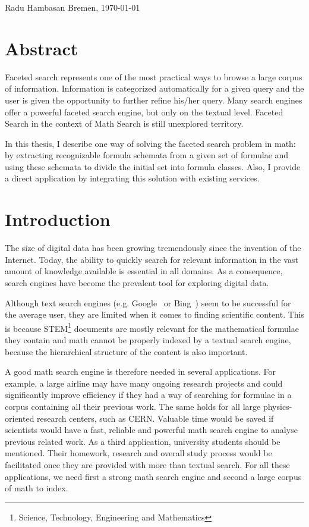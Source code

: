 \documentclass[a4paper,11pt,oneside]{article}
\begin{document}
\vspace{20mm}

Radu Hambasan \hfill Bremen, \today

\newpage

\section*{Abstract}
Faceted search represents one of the most practical ways to browse a large
corpus of information. Information is categorized automatically for
a given query and the user is given the opportunity to further refine 
his/her query. Many search engines offer a powerful faceted search engine,
but only on the textual level. Faceted Search in the context of Math Search
is still unexplored territory.

In this thesis, I describe one way of solving the faceted search problem in
math: by extracting recognizable formula schemata from a given set of formulae
and using these schemata to divide the initial set into formula classes. Also,
I provide a direct application by integrating this solution with existing
services.

\tableofcontents

\clearpage {}

\section{Introduction}\label{sec:intro}

The size of digital data has been growing tremendously since the invention
of the Internet. Today, the ability to quickly search for relevant information
in the vast amount of knowledge available is essential in all domains.
As a consequence, search engines have become the prevalent tool for exploring
digital data.

Although text search engines (e.g. Google~\cite{google:online} or
Bing~\cite{bing:online}) seem to be successful for the average user, they are
limited when it comes to finding scientific content. This is because
STEM\footnote{Science, Technology, Engineering and Mathematics} documents are
mostly relevant for the mathematical formulae they contain and math cannot be
properly indexed by a textual search engine, because the hierarchical structure
of the content is also important.

A good math search engine is therefore needed in several applications. 
For example, a large airline may have many ongoing research projects and could
significantly improve efficiency if they had a way of searching for formulae in
a corpus containing all their previous work. The same holds for all large
physics-oriented research centers, such as CERN. Valuable time would be saved
if scientists would have a fast, reliable and powerful math search engine to
analyse previous related work. As a third application, university students
should be mentioned. Their homework, research and overall study process would
be facilitated once they are provided with more than textual search. For all
these applications, we need first a strong math search engine and second a
large corpus of math to index.
\end{document}
